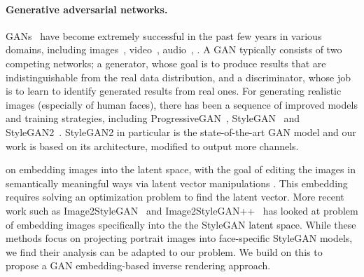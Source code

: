 \paragraph{Generative adversarial networks.}
GANs~\cite{GAN} have become extremely successful in the past few years in various domains, including images~\cite{DCGAN}, video~\cite{Tulyakov18}, audio~\cite{Donahue18}, . A GAN typically consists of two competing networks; a generator, whose goal is to produce results that are indistinguishable from the real data distribution, and a discriminator, whose job is to learn to identify generated results from real ones. For generating realistic images (especially of human faces), there has been a sequence of improved models and training strategies, including ProgressiveGAN~\cite{Karras2018}, StyleGAN~ and StyleGAN2~. StyleGAN2 in particular is the state-of-the-art GAN model and our work is based on its architecture, modified to output more channels.

 on embedding images into the latent space, with the goal of editing the images in semantically meaningful ways via latent vector manipulations \cite{Zhu2016}. This embedding requires solving an optimization problem to find the latent vector.
More recent work such as Image2StyleGAN~\cite{Abdal19a} and Image2StyleGAN++~\cite{Abdal19b} has looked at problem of embedding images specifically into the the StyleGAN latent space. While these methods focus on projecting portrait images into face-specific StyleGAN models, we find their analysis can be adapted to our problem.
We build on this to propose a GAN embedding-based inverse rendering approach.





